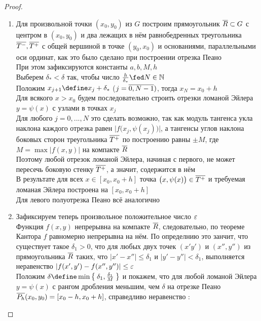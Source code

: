\begin{proof}
	\hfill
    \begin{enumerate}
        \item Для произвольной точки $ (x_0, y_0) $ из $ G $ построим прямоугольник $ \overline{R} \subset G $ с центром в $ (x_0, y_0) $ и два лежащих в нём равнобедренных треугольника $ \overline{T^-}, \overline{T^+} $ с общей вершиной в точке $ (y_0, x_0) $ и основаниями, параллельными оси ординат, как это было сделано при построении отрезка Пеано \\
        При этом зафиксируются константы $ a, b, M, h $ \\
        Выберем $ \delta_* < \delta $ так, чтобы число $ \frac{h}{\delta_*} \fed N \in \N $ \\
        Положим $ x_{j + 1} \define x_j + \delta_* $ ($ j = \overline{0, N - 1}) $, тогда $ x_N = x_0 + h $ \\
        Для всякого $ x > x_0 $ будем последовательно строить отрезки ломаной Эйлера $ y = \psi(x) $ с узлами в точках $ x_j $ \\
        Для любого $ j = 0, ..., N $ это сделать возможно, так как модуль тангенса укла наклона каждого отрезка равен $ \big| f \big(x_j, \psi(x_j) \big) \big| $, а тангенсы углов наклона боковых сторон треугольника $ \overline{T^+} $ по построению равны $ \pm M $, где $ M = \max|f(x, y)| $ на компакте $ \overline{R} $ \\
        Поэтому любой отрезок ломаной Эйлера, начиная с первого, не может пересечь боковую стенку $ \overline{T^+} $, а значит, содержится в нём \\
        В результате для всех $ x \in [x_0, x_0 + h] $ точка $ \big( x, \psi(x) \big) \in \overline{T^+} $ и требуемая ломаная Эйлера построена на $ [x_0, x_0 + h] $ \\
        Для левого полуотрезка Пеано всё аналогично
        \item Зафиксируем теперь произвольное положительное число $ \varepsilon $ \\
        Функция $ f(x, y) $ непрерывна на компакте $ \overline{R} $, следовательно, по теореме Кантора $ f $ равномерно непрерывна на нём. По определнию это занчит, что существует такое $ \delta_1 > 0 $, что для любых двух точек $ (x' y') $ и $ (x'', y'') $ из прямоугольника $ \overline{R} $ таких, что $ |x' - x''| \le \delta_1 $ и $ |y' - y''| < \delta_1 $, выполняется неравенство $ |f(x', y') - f(x'', y'')| \le \varepsilon $ \\
        Положим $ \delta \define \min\set{\delta_1, \frac{\delta_1}M} $ и покажем, что для любой ломаной Эйлера $ y = \psi(x) $ с рангом дробления меньшим, чем $ \delta $ на отрезке Пеано $ \overline{P_h}(x_0, y_0) = [x_0 - h, x_0 + h] $, справедливо неравенство : \\

\end{enumerate}
\end{proof}
